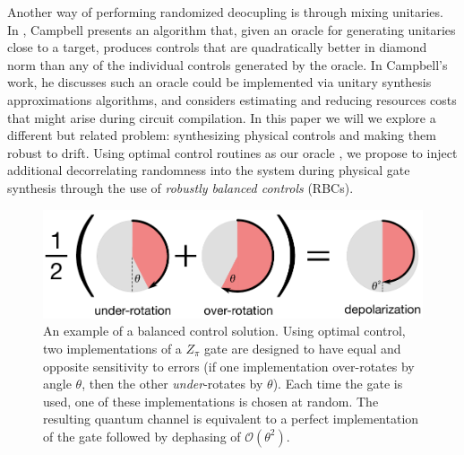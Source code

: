 \documentclass[aps,nofootinbib,pra,notitlepage,twocolumn]{revtex4-1}
\newcommand{\order}[1]{\mathcal{O}\left( #1 \right)}
\begin{document}
Another way of performing randomized deocupling is through mixing unitaries. In \cite{Campbell2017}, Campbell presents an algorithm that, given an oracle for generating unitaries close to a target, produces controls that are quadratically better in diamond norm than any of the individual controls generated by the oracle. In Campbell's work, he discusses such an oracle could be implemented via unitary synthesis approximations algorithms\cite{1612.01011}, and considers estimating and reducing resources costs that might arise during circuit compilation. In this paper we will we explore a different but related problem: synthesizing physical controls and making them robust to drift. Using optimal control routines as our oracle , we propose to inject additional decorrelating randomness into the system during physical gate synthesis through the use of \emph{robustly balanced controls} (RBCs).

\begin{figure}
  \centering
  \includegraphics[width=\columnwidth]{simple_example.pdf}
  \caption{An example of a balanced control solution. Using optimal control, two implementations of a $Z_\pi$ gate are designed to have equal and opposite sensitivity to errors (if one implementation over-rotates by angle $\theta$, then the other \emph{under}-rotates by $\theta$). Each time the gate is used, one of these implementations is chosen at random. The resulting quantum channel is equivalent to a perfect implementation of the gate followed by dephasing of $\order{\theta^2}$.}
  \label{fig:simple_example}
\end{figure}
\end{document}

